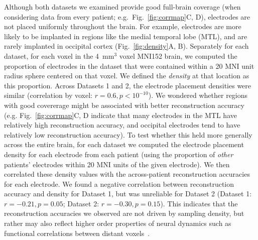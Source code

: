 \documentclass[11pt]{article}
\begin{document}
Although both datasets we examined provide good full-brain coverage
(when considering data from every patient; e.g.\
Fig.~\ref{fig:corrmap}C, D), electrodes are not placed uniformly
throughout the brain.  For example, electrodes are more likely to be
implanted in regions like the medial temporal lobe (MTL), and are
rarely implanted in occipital cortex (Fig.~\ref{fig:density}A, B).
Separately for each dataset, for each voxel in the 4~mm$^3$ voxel
MNI152 brain, we computed the proportion of electrodes in the dataset
that were contained within a 20 MNI unit radius sphere centered on
that voxel.  We defined the \textit{density} at that location as this
proportion.  Across Datasets 1 and 2, the electrode placement
densities were similar (correlation by voxel:
$r = 0.6, p < 10^{-10}$).  We wondered whether regions with good
covererage might be associated with better reconstruction accuracy
(e.g. Fig.~\ref{fig:corrmap}C, D indicate that many electrodes in the
MTL have relatively high reconstruction accuracy, and occipital
electrodes tend to have relatively low reconstruction accuracy).  To
test whether this held more generally across the entire brain, for
each dataset we computed the electrode placement density for each
electrode from each patient (using the proportion of \textit{other}
patients' electrodes within 20 MNI units of the given electrode).  We
then correlated these density values with the across-patient
reconstruction accuracies for each electrode.  We found a negative
correlation between reconstruction accuracy and density for Dataset 1,
but was unreliable for Dataset 2 (Dataset 1: $r = -0.21, p = 0.05$; Dataset 2:
$r = -0.30, p = 0.15$).  This indicates that the reconstruction
accuracies we observed are not driven by sampling density, but
rather may also reflect higher order properties of neural dynamics
such as functional correlations between distant
voxels~\citep{BetzEtal17b}.
\end{document}
